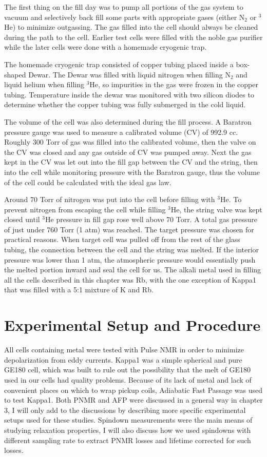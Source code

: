 The first thing on the fill day was to pump all portions of the gas system to vacuum and selectively back fill some parts with appropriate gases (either N$_2$ or $^{3}$He) to minimize outgassing. The gas filled into the cell should always be cleaned during the path to the cell. Earlier test cells were filled with the noble gas purifier while the later cells were done with a homemade cryogenic trap.

The homemade cryogenic trap consisted of copper tubing placed inside a box-shaped Dewar. The Dewar was filled with liquid nitrogen when filling N$_2$ and liquid helium when filling $^{3}$He, so impurities in the gas were frozen in the copper tubing. Temperature inside the dewar was monitored with two silicon diodes to determine whether the copper tubing was fully submerged in the cold liquid.

The volume of the cell was also determined during the fill process. A Baratron pressure gauge was used to measure a calibrated volume (CV) of 992.9 cc. Roughly 300 Torr of gas was filled into the calibrated volume, then the valve on the CV was closed and any gas outside of CV was pumped away. Next the gas kept in the CV was let out into the fill gap between the CV and the string, then into the cell while monitoring pressure with the Baratron gauge, thus the volume of the cell could be calculated with the ideal gas law.

Around 70 Torr of nitrogen was put into the cell before filling with $^{3}$He. To prevent nitrogen from escaping the cell while filling $^{3}$He, the string valve was kept closed until $^{3}$He pressure in fill gap rose well above 70 Torr. A total gas pressure of just under 760 Torr (1 atm) was reached. The target pressure was chosen for practical reasons. When target cell was pulled off from the rest of the glass tubing, the connection between the cell and the string was melted. If the interior pressure was lower than 1 atm, the atmospheric pressure would essentially push the melted portion inward and seal the cell for us. The alkali metal used in filling all the cells described in this chapter was Rb, with the one exception of Kappa1 that was filled with a 5:1 mixture of K and Rb.

\section{Experimental Setup and Procedure}

All cells containing metal were tested with Pulse NMR in order to minimize depolarization from eddy currents. Kappa1 was a simple spherical and pure GE180 cell, which was built to rule out the possibility that the melt of GE180 used in our cells had quality problems. Because of its lack of metal and lack of convenient places on which to wrap pickup coils, Adiabatic Fast Passage was used to test Kappa1. Both PNMR and AFP were discussed in a general way in chapter 3, I will only add to the discussions by describing more specific experimental setups used for these studies. Spindown measurements were the main means of studying relaxation properties, I will also discuss how we used spindowns with different sampling rate to extract PNMR losses and lifetime corrected for such losses.

